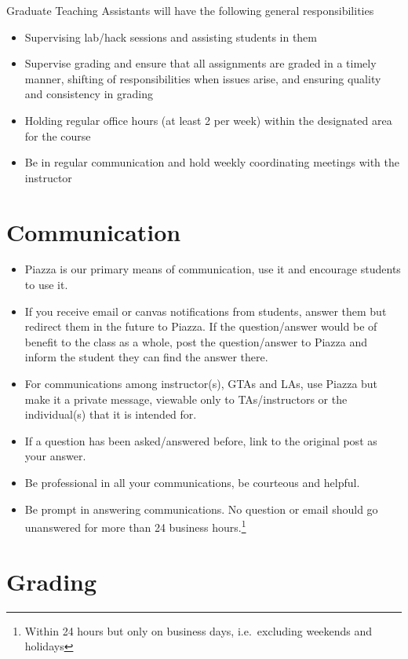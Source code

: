 \documentclass[12pt]{scrartcl}
\begin{document}
Graduate Teaching Assistants will have the following general responsibilities
\begin{itemize}
  \item Supervising lab/hack sessions and assisting students in them
  \item Supervise grading and ensure that all assignments are graded 
    in a timely manner, shifting of responsibilities when issues arise, and ensuring quality and consistency in grading
  \item Holding regular office hours (at least 2 per week) within the
  designated area for the course
  \item Be in regular communication and hold weekly coordinating meetings with the instructor
\end{itemize}


\section*{Communication}

\begin{itemize}
  \item Piazza is our primary means of communication, use it and encourage 
students to use it.  
  \item If you receive email or canvas notifications from students, answer them 
but redirect them in the future to Piazza.  If the question/answer
would be of benefit to the class as a whole, post the question/answer
to Piazza and inform the student they can find the answer there.
  \item For communications among instructor(s), GTAs and LAs, use Piazza but
make it a private message, viewable only to TAs/instructors or the
individual(s) that it is intended for.
  \item If a question has been asked/answered before, link to the original
  post as your answer.
  \item Be professional in all your communications, be courteous and
  helpful.  
  \item Be prompt in answering communications.  No question or email should go 
  unanswered for more than 24 business hours.\footnote{Within 24 hours but only
  on business days, i.e.\ excluding weekends and holidays}
\end{itemize}

\section*{Grading}
\end{document}
